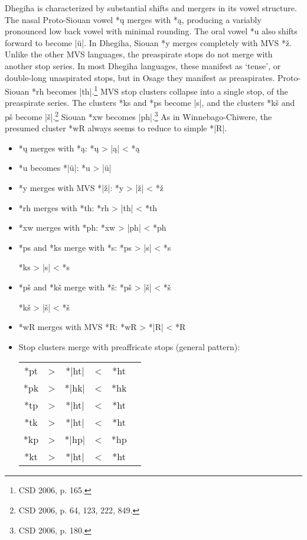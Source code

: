 \documentclass[output=paper]{LSP/langsci}
\begin{document}
Dhegiha is characterized by substantial shifts and mergers in its vowel structure.  The nasal Proto-Siouan vowel *\k{u} merges with *\k{a}, producing a variably pronounced low back vowel with minimal rounding.  The oral vowel *u also shifts forward to become |\"u|.  In Dhegiha, Siouan *y merges completely with MVS *\v{z}.  Unlike the other MVS languages, the preaspirate stops do not merge with another stop series.  In most Dhegiha languages, these manifest as `tense', or double-long unaspirated stops, but in Osage they manifest as preaspirates.  Proto-Siouan *rh becomes |th|.\footnote{CSD 2006, p. 165.} MVS stop clusters collapse into a single stop, of the preaspirate series.  The clusters *ks and *ps become |s|, and the clusters *k\v{s} and p\v{s} become |\v{s}|.\footnote{CSD 2006, p. 64, 123, 222, 849.} Siouan *xw becomes |ph|.\footnote{CSD 2006, p. 180.} As in Winnebago-Chiwere, the presumed cluster *wR always seems to reduce to simple *|R|.

\begin{itemize}
\item *\k{u} merges with *\k{a}: \hspace{3.1em} *\k{u}	>	|\k{a}|	<	*\k{a}
\item *u becomes *|\"u|:	 \hspace{4.1em} *u	>	|\"u|
\item *y merges with MVS *|\v{z}|: \hspace{1em} *y	>	|\v{z}|	<	*\v{z}
\item *rh merges with *th: \hspace{3em} *rh	>	|th|	<	*th
\item *xw merges with *ph:	\hspace{ 3em} *xw	>	|ph|	<	*ph
\item *ps and *ks merge with *s: \hspace{1em} *ps	>	|s|	<	*s

\hspace{12em} *ks	>	|s|	<	*s
\item *p\v{s} and *k\v{s} merge with *\v{s}: \hspace{1em} *p\v{s}	>	|\v{s}|	<	*\v{s}

\hspace{12em} *k\v{s}	>	|\v{s}|	<	*\v{s}
\item *wR merges with MVS *R: \hspace{1em} *wR	>	*|R|	<	*R
\item Stop clusters merge with preaffricate stops (general pattern):	
\begin{center}
\begin{tabular}[t]{c c c c c c }
*pt & > & *|ht| & < & *ht \\
*pk	& > & *|hk| & < & *hk \\
*tp & > & *|ht| & < & *ht \\
*tk & > & *|ht| & < & *ht \\
*kp	& >	 & *|hp|	& <	& *hp \\
*kt	& >	& *|ht| & < & *ht \\
\end{tabular}
\end{center} 
\end{itemize} 
 
\end{document}
